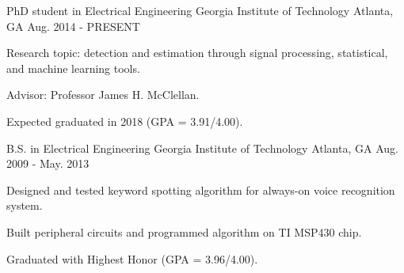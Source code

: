 

\begin{cventries}

  \cventry
    {PhD student in Electrical Engineering} %
    {Georgia Institute of Technology} %
    {Atlanta, GA} %
    {Aug. 2014 - PRESENT} %
    {
      \begin{cvitems} %
        \item {Research topic: detection and estimation through signal processing, statistical, and machine learning tools.}
        \item {Advisor: Professor James H. McClellan.}
        \item {Expected graduated in 2018 (GPA = 3.91/4.00).}
      \end{cvitems}
    }
    
  \cventry
    {B.S. in Electrical Engineering} %
    {Georgia Institute of Technology} %
    {Atlanta, GA} %
    {Aug. 2009 - May. 2013} %
    {
      \begin{cvitems} %
        \item {Designed and tested keyword spotting algorithm for always-on voice recognition system.}
        \item {Built peripheral circuits and programmed algorithm on TI MSP430 chip.}
        \item {Graduated with Highest Honor (GPA = 3.96/4.00).}
      \end{cvitems}
    }

\end{cventries}
